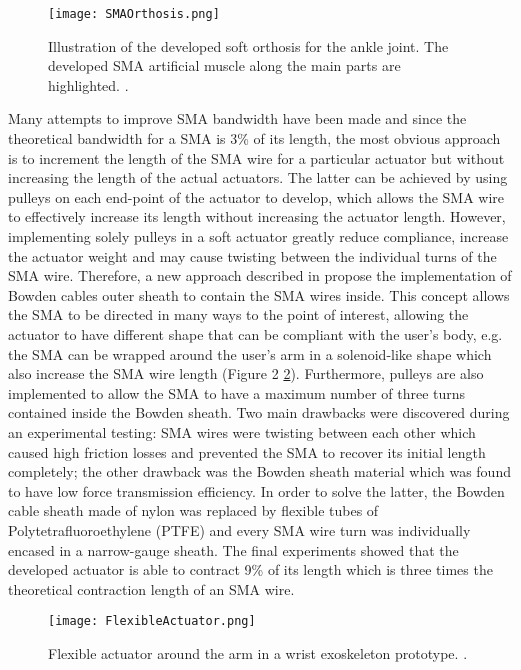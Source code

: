 \begin{figure}[hb!]
    \centering
    \texttt{[image: SMAOrthosis.png]}
    \caption{Illustration of the developed soft orthosis for the ankle joint. The developed SMA artificial muscle along the main parts are highlighted. \cite{Zhang2013a}. }
    \label{fig:SMA_orthosis}
\end{figure}

Many attempts to improve SMA bandwidth have been made and since the theoretical bandwidth for a SMA is 3\% of its length, the most obvious approach is to increment the length of the SMA wire for a particular actuator but without increasing the length of the actual actuators. The latter can be achieved by using pulleys on each end-point of the actuator to develop, which allows the SMA wire to effectively increase its length without increasing the actuator length. However, implementing solely pulleys in a soft actuator greatly reduce compliance, increase the actuator weight and may cause twisting between the individual turns of the SMA wire. Therefore, a new approach described in \cite{Villoslada2015} propose the implementation of Bowden cables outer sheath to contain the SMA wires inside. This concept allows the SMA to be directed in many ways to the point of interest, allowing the actuator to have different shape that can be compliant with the user’s body, e.g. the SMA can be wrapped around the user’s arm in a solenoid-like shape which also increase the SMA wire length (Figure 2 \ref{fig:flexible_actuator}). Furthermore, pulleys are also implemented to allow the SMA to have a maximum number of three turns contained inside the Bowden sheath. Two main drawbacks were discovered during an experimental testing: SMA wires were twisting between each other which caused high friction losses and prevented the SMA to recover its initial length completely; the other drawback was the Bowden sheath material which was found to have low force transmission efficiency. In order to solve the latter, the Bowden cable sheath made of nylon was replaced by flexible tubes of Polytetrafluoroethylene (PTFE) and every SMA wire turn was individually encased in a narrow-gauge sheath. The final experiments showed that the developed actuator is able to contract 9\% of its length which is three times the theoretical contraction length of an SMA wire.

\begin{figure}[hb!]
    \centering
    \texttt{[image: FlexibleActuator.png]}
    \caption{Flexible actuator around the arm in a wrist exoskeleton prototype. \cite{Villoslada2015}. }
    \label{fig:flexible_actuator}
\end{figure}


